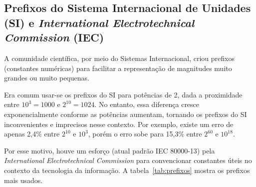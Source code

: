 \documentclass[12pt]{article}
\begin{document}
\subsection[Prefixos do SI e IEC]{Prefixos do Sistema Internacional de Unidades (SI) e \textit{International Electrotechnical Commission} (IEC)}

A comunidade científica, por meio do Sistemas Internacional, criou prefixos (constantes numéricas) para facilitar a representação de magnitudes muito grandes ou muito pequenas.

Era comum usar-se os prefixos do SI para potências de 2, dada a proximidade entre \(10^3=1000\) e \(2^{10}=1024\). No entanto, essa diferença cresce exponencialmente conforme as potências aumentam, tornando os prefixos do SI inconvenientes e imprecisos nesse contexto. Por exemplo, existe um erro de apenas 2,4\% entre \(2^{10}\) e \(10^3\), porém o erro sobe para 15,3\% entre \(2^{60}\) e \(10^{18}\).

Por esse motivo, houve um esforço (atual padrão IEC 80000-13) pela \textit{International Electrotechnical Commission} para convencionar constantes úteis no contexto da tecnologia da informação. A tabela~\ref{tab:prefixos} mostra os prefixos mais usados.
\end{document}

